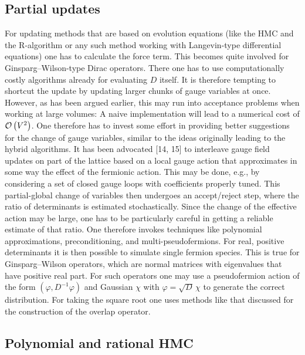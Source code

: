 \subsection{Partial updates}

For updating methods that are based on evolution equations (like the HMC and
the R-algorithm or any such method working with Langevin-type differential
equations) one has to calculate the force term. This becomes quite involved for
Ginsparg--Wilson-type Dirac operators. There one has to use computationally
costly algorithms already for evaluating $D$ itself.
It is therefore tempting to shortcut the update by updating larger chunks of
gauge variables at once. However, as has been argued earlier, this may run into
acceptance problems when working at large volumes: A naive implementation will
lead to a numerical cost of $\mathcal{O}\left(V^2\right)$. One therefore has to invest some
effort in providing better suggestions for the change of gauge variables,
similar to the ideas originally leading to the hybrid algorithms.
It has been advocated [14, 15] to interleave gauge field updates on part of the
lattice based on a local gauge action that approximates in some way the effect
of the fermionic action. This may be done, e.g., by considering a set of closed
gauge loops with coefficients properly tuned. This partial-global change of
variables then undergoes an accept/reject step, where the ratio of determinants
is estimated stochastically. Since the change of the effective action may be
large, one has to be particularly careful in getting a reliable estimate of
that ratio. One therefore invokes techniques like polynomial approximations,
preconditioning, and multi-pseudofermions.
For real, positive determinants it is then possible to simulate single fermion
species. This is true for Ginsparg--Wilson operators, which are normal matrices
with eigenvalues that have positive real part. For such operators one may use a
pseudofermion action of the form $(\varphi, D^{-1}\varphi)$ and Gaussian
$\chi$ with $\varphi = \sqrt{D}\,\chi$ to generate the correct distribution. For
taking the square root one uses methods like that discussed for the
construction of the overlap operator.

\subsection{Polynomial and rational HMC}

